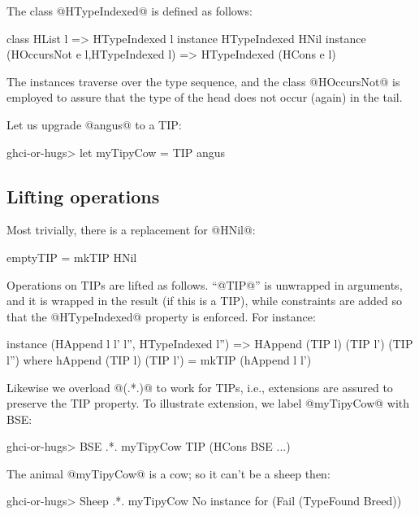\documentclass[nocopyrightspace,preprint]{sigplan-proc}
\begin{document}
The class @HTypeIndexed@ is defined as follows:

\begin{code}
 class HList l => HTypeIndexed l
 instance HTypeIndexed HNil
 instance (HOccursNot e l,HTypeIndexed l)
       => HTypeIndexed (HCons e l)
\end{code}

The instances traverse over the type sequence, and the class
@HOccursNot@ is employed to assure that the type of the head does not
occur (again) in the tail.

Let us upgrade @angus@ to a TIP:

\begin{code}
 ghci-or-hugs> let myTipyCow = TIP angus
\end{code}


\medskip

\subsection*{Lifting operations}

Most trivially, there is a replacement for @HNil@:

\begin{code}
 emptyTIP = mkTIP HNil
\end{code}

Operations on TIPs are lifted as follows. ``@TIP@'' is unwrapped in
arguments, and it is wrapped in the result (if this is a TIP), while
constraints are added so that the @HTypeIndexed@ property is
enforced. For instance:

\begin{code}
 instance (HAppend l l' l'', HTypeIndexed l'') 
       =>  HAppend (TIP l) (TIP l') (TIP l'')
 where hAppend (TIP l) (TIP l') = mkTIP (hAppend l l')
\end{code}

Likewise we overload @(.*.)@ to work for TIPs, i.e., extensions are
assured to preserve the TIP property. To illustrate extension, we
label @myTipyCow@ with BSE:

\begin{code}
 ghci-or-hugs> BSE .*. myTipyCow
 TIP (HCons BSE ...)
\end{code}

The animal @myTipyCow@ is a cow; so it can't be a sheep then:

\begin{code}
 ghci-or-hugs> Sheep .*. myTipyCow
 No instance for (Fail (TypeFound Breed))
\end{code}
\end{document}
